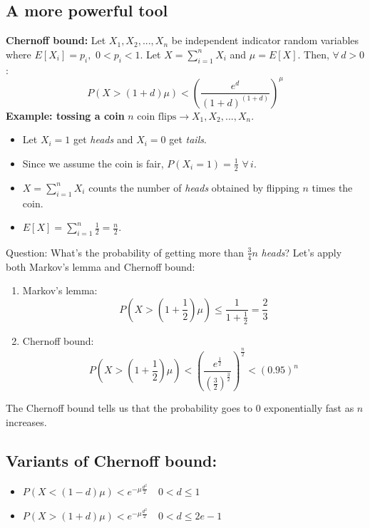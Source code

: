 \subsection{A more powerful tool}
\textbf{Chernoff bound:} Let $X_1, X_2, ..., X_n$ be independent indicator random variables where $E[X_i] = p_i ,\,\, 0 < p_i < 1$. Let $X = \sum_{i=1}^n X_i$ and $\mu = E[X]$. Then, $\forall\, d > 0$:
\[P(X > (1+d)\mu) < \left(\frac{e^d}{(1+d)^{(1+d)}}\right)^\mu\]
\textbf{Example: tossing a coin}\newline\newline
$n\text{ coin flips}\rightarrow X_1, X_2, ..., X_n$.
\begin{itemize}
    \item Let $X_i = 1$ get \textit{heads} and $X_i = 0$ get \textit{tails}.

    \item Since we assume the coin is fair, $P(X_i = 1) = \frac{1}{2} \,\, \forall \, i$.

    \item $X = \sum_{i=1}^n X_i$ counts the number of \textit{heads} obtained by flipping $n$ times the coin.

    \item $E[X] = \sum_{i=1}^n \frac{1}{2} = \frac{n}{2}$.
\end{itemize}
Question: What's the probability of getting more than $\frac{3}{4}n$ \textit{heads}? Let's apply both Markov's lemma and Chernoff bound:
\begin{enumerate}
    \item Markov's lemma:
    \[P(X > (1 + \frac{1}{2})\mu) \leq \frac{1}{1 + \frac{1}{2}} = \frac{2}{3}\]

    \item Chernoff bound:
    \[P(X > (1 + \frac{1}{2})\mu) < \left(\frac{e^{\frac{1}{2}}}{(\frac{3}{2})^{\frac{3}{2}}}\right)^{\frac{n}{2}} < (0.95)^n\]
\end{enumerate}
The Chernoff bound tells us that the probability goes to 0 exponentially fast as $n$ increases.

\subsection{Variants of Chernoff bound:}
\begin{itemize}
    \item $P(X < (1 - d)\mu) < e^{-\mu\frac{d^2}{2}} \quad 0 < d \leq 1$

    \item $P(X > (1 + d)\mu) < e^{-\mu\frac{d^2}{2}} \quad 0 < d \leq 2e - 1$
\end{itemize}


